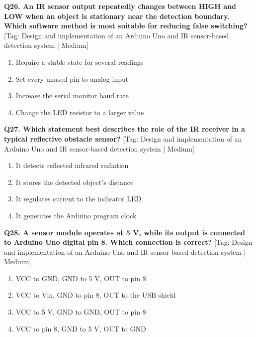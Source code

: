 \noindent\textbf{Q26. An IR sensor output repeatedly changes between HIGH and LOW when an object is stationary near the detection boundary. Which software method is most suitable for reducing false switching?} \hfill [Tag: Design and implementation of an Arduino Uno and IR sensor-based detection system | Medium]
\begin{enumerate}[label=(\alph*),topsep=2pt,itemsep=1pt,partopsep=0pt,parsep=0pt]
    \item {Require a stable state for several readings}
    \item {Set every unused pin to analog input}
    \item {Increase the serial monitor baud rate}
    \item {Change the LED resistor to a larger value}
\end{enumerate}
\vspace{2mm}

\noindent\textbf{Q27. Which statement best describes the role of the IR receiver in a typical reflective obstacle sensor?} \hfill [Tag: Design and implementation of an Arduino Uno and IR sensor-based detection system | Medium]
\begin{enumerate}[label=(\alph*),topsep=2pt,itemsep=1pt,partopsep=0pt,parsep=0pt]
    \item {It detects reflected infrared radiation}
    \item {It stores the detected object's distance}
    \item {It regulates current to the indicator LED}
    \item {It generates the Arduino program clock}
\end{enumerate}
\vspace{2mm}

\noindent\textbf{Q28. A sensor module operates at 5 V, while its output is connected to Arduino Uno digital pin 8. Which connection is correct?} \hfill [Tag: Design and implementation of an Arduino Uno and IR sensor-based detection system | Medium]
\begin{enumerate}[label=(\alph*),topsep=2pt,itemsep=1pt,partopsep=0pt,parsep=0pt]
    \item {VCC to GND, GND to 5 V, OUT to pin 8}
    \item {VCC to Vin, GND to pin 8, OUT to the USB shield}
    \item {VCC to 5 V, GND to GND, OUT to pin 8}
    \item {VCC to pin 8, GND to 5 V, OUT to GND}
\end{enumerate}
\vspace{2mm}

